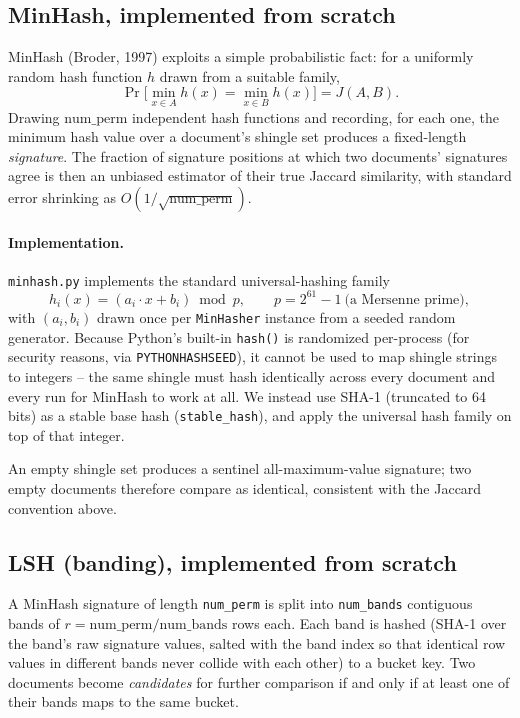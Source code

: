 \documentclass[11pt]{article}
\begin{document}
\subsection{MinHash, implemented from scratch}

MinHash (Broder, 1997) exploits a simple probabilistic fact: for a uniformly random hash function $h$
drawn from a suitable family,
\[
    \Pr\big[\min_{x \in A} h(x) = \min_{x \in B} h(x)\big] = J(A, B).
\]
Drawing $\text{num\_perm}$ independent hash functions and recording, for each one, the minimum hash value
over a document's shingle set produces a fixed-length \emph{signature}. The fraction of signature
positions at which two documents' signatures agree is then an unbiased estimator of their true Jaccard
similarity, with standard error shrinking as $O(1/\sqrt{\text{num\_perm}})$.

\paragraph{Implementation.} \verb|minhash.py| implements the standard universal-hashing family
\[
    h_i(x) = (a_i \cdot x + b_i) \bmod p, \qquad p = 2^{61} - 1 \ \text{(a Mersenne prime)},
\]
with $(a_i, b_i)$ drawn once per \verb|MinHasher| instance from a seeded random generator. Because
Python's built-in \verb|hash()| is randomized per-process (for security reasons, via
\verb|PYTHONHASHSEED|), it cannot be used to map shingle strings to integers -- the same shingle must hash
identically across every document and every run for MinHash to work at all. We instead use SHA-1
(truncated to 64 bits) as a stable base hash (\verb|stable_hash|), and apply the universal hash family on
top of that integer.

An empty shingle set produces a sentinel all-maximum-value signature; two empty documents therefore compare
as identical, consistent with the Jaccard convention above.

\subsection{LSH (banding), implemented from scratch}

A MinHash signature of length \verb|num_perm| is split into \verb|num_bands| contiguous bands of
$r = \text{num\_perm} / \text{num\_bands}$ rows each. Each band is hashed (SHA-1 over the band's raw
signature values, salted with the band index so that identical row values in different bands never
collide with each other) to a bucket key. Two documents become \emph{candidates} for further comparison
if and only if at least one of their bands maps to the same bucket.
\end{document}
